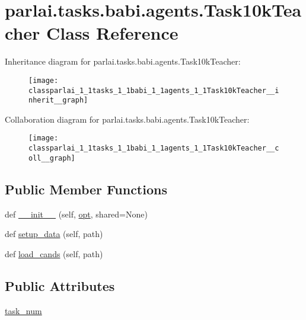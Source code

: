 \hypertarget{classparlai_1_1tasks_1_1babi_1_1agents_1_1Task10kTeacher}{}\section{parlai.\+tasks.\+babi.\+agents.\+Task10k\+Teacher Class Reference}
\label{classparlai_1_1tasks_1_1babi_1_1agents_1_1Task10kTeacher}


Inheritance diagram for parlai.\+tasks.\+babi.\+agents.\+Task10k\+Teacher\+:
\nopagebreak
\begin{figure}[H]
\begin{center}
\leavevmode
\texttt{[image: classparlai\_1\_1tasks\_1\_1babi\_1\_1agents\_1\_1Task10kTeacher\_\_inherit\_\_graph]}
\end{center}
\end{figure}


Collaboration diagram for parlai.\+tasks.\+babi.\+agents.\+Task10k\+Teacher\+:
\nopagebreak
\begin{figure}[H]
\begin{center}
\leavevmode
\texttt{[image: classparlai\_1\_1tasks\_1\_1babi\_1\_1agents\_1\_1Task10kTeacher\_\_coll\_\_graph]}
\end{center}
\end{figure}
\subsection*{Public Member Functions}
\begin{DoxyCompactItemize}
\item 
def \hyperlink{classparlai_1_1tasks_1_1babi_1_1agents_1_1Task10kTeacher_a2a37e51cf3bf8c1248b60a211aaa4081}{\+\_\+\+\_\+init\+\_\+\+\_\+} (self, \hyperlink{classparlai_1_1core_1_1teachers_1_1FbDialogTeacher_af7a9ec497b9cd0292d7b8fa220da7c28}{opt}, shared=None)
\item 
def \hyperlink{classparlai_1_1tasks_1_1babi_1_1agents_1_1Task10kTeacher_a658de67a884d117c04f54e3f9d4bec4a}{setup\+\_\+data} (self, path)
\item 
def \hyperlink{classparlai_1_1tasks_1_1babi_1_1agents_1_1Task10kTeacher_af80438ce3c1fa375e4dbed775afb9ed2}{load\+\_\+cands} (self, path)
\end{DoxyCompactItemize}
\subsection*{Public Attributes}
\begin{DoxyCompactItemize}
\item 
\hyperlink{classparlai_1_1tasks_1_1babi_1_1agents_1_1Task10kTeacher_a71c66ccc1c27b22f0e49863c0926d59c}{task\+\_\+num}
\end{DoxyCompactItemize}
